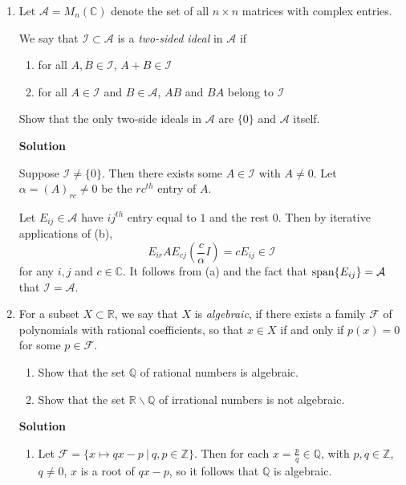 \documentclass{article}
\def\span{\mathop{\rm span}\nolimits}
\begin{document}
\begin{enumerate}
{\bf Solution}



\item Let \(\mathcal{A} = M_n(\mathbb{C})\) denote the set of all \(n \times n\) matrices with complex entries.

We say that \(\mathcal{I} \subset \mathcal{A}\) is a {\em two-sided ideal} in \(\mathcal{A}\) if
\begin{enumerate}
\item for all \(A,B \in \mathcal{I}\), \(A + B \in \mathcal{I}\)
\item for all \(A \in \mathcal{I}\) and \(B \in \mathcal{A}\), \(AB\) and \(BA\) belong to \(\mathcal{I}\)
\end{enumerate}
Show that the only two-side ideals in \(\mathcal{A}\) are \(\{0\}\) and \(\mathcal{A}\) itself.

{\bf Solution}

Suppose \(\mathcal{I} \neq \{0\}\).  Then there exists some \(A \in \mathcal{I}\) with \(A \neq 0\).  Let \(\alpha = (A)_{rc} \neq 0\) be the \(rc^{th}\) entry of \(A\).

Let \(E_{ij} \in \mathcal{A}\) have \(ij^{th}\) entry equal to \(1\) and the rest \(0\).  Then by iterative applications of (b),
\[E_{ir}AE_{cj} \left( \frac{c}{\alpha}I \right) = cE_{ij} \in \mathcal{I}\]
for any \(i,j\) and \(c \in \mathbb{C}\).  It follows from (a) and the fact that \(\span \{E_{ij}\} = \mathcal{A}\) that \(\mathcal{I} = \mathcal{A}\).



\item For a subset \(X \subset \mathbb{R}\), we say that \(X\) is {\em algebraic}, if there exists a family \(\mathcal{F}\) of polynomials with rational coefficients, so that \(x \in X\) if and only if \(p(x) = 0\) for some \(p \in \mathcal{F}\).

\begin{enumerate}
\item Show that the set \(\mathbb{Q}\) of rational numbers is algebraic.

\item Show that the set \(\mathbb{R} \backslash \mathbb{Q}\) of irrational numbers is not algebraic.

\end{enumerate}

{\bf Solution}

\begin{enumerate}
\item Let \(\mathcal{F} = \{x \mapsto qx - p \ | \ q,p \in \mathbb{Z}\}\).  Then for each \(x = \frac{p}{q} \in \mathbb{Q}\), with \(p,q \in \mathbb{Z}\), \(q \neq 0\), \(x\) is a root of \(qx - p\), so it follows that \(\mathbb{Q}\) is algebraic.


\end{enumerate}
\end{enumerate}
\end{document}
